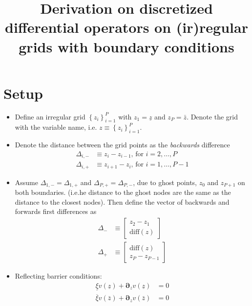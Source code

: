 \documentclass[11pt]{article}
\newcommand{\D}[1][]{\ensuremath{\boldsymbol{\partial}_{#1}}}
\newcommand{\set}[1]{\ensuremath{\left\{{#1}\right\}}}
\begin{document}
\title{Derivation on discretized differential operators on (ir)regular grids with boundary conditions}
\maketitle

\section{Setup}

\begin{itemize}
	\item Define an irregular grid $\set{z_i}_{i=1}^P$ with $z_1 = \underline{z}$ and $z_P = \bar{z}$. Denote the grid with the variable name, i.e. $z \equiv \set{z_i}_{i=1}^P$.
	\item Denote the distance between the grid points as the \textit{backwards} difference
	\begin{align}
	\Delta_{i,-} &\equiv z_i - z_{i-1},\, \text{for } i = 2,\ldots, P\\
	\Delta_{i,+} &\equiv z_{i+1} - z_i,\, \text{for } i = 1,\ldots, P-1
	\end{align}
	
	\item Assume $\Delta_{1, -} = \Delta_{1, +}$ and $\Delta_{P, +} = \Delta_{P, -}$, due to ghost points, $z_0$ and $z_{P+1}$ on both boundaries. (i.e.he distance to the ghost nodes are the same as the distance to the closest nodes).  Then define the vector of backwards and forwards first differences as
	\begin{align}
	\Delta_{-} &\equiv \begin{bmatrix} z_2 - z_1 \\
	\text{diff}(z)
	\end{bmatrix}\\
	\Delta_{+} &\equiv \begin{bmatrix} \text{diff}(z)\\
	z_P - z_{P-1}
	\end{bmatrix}
	\end{align}
	\item Reflecting barrier conditions:
	\begin{align}
	\underline{\xi} v(\underline{z}) + \D[z]v(\underline{z} ) &= 0\label{eq:new-BC1}\\
	\overline{\xi} v(\bar{z}) + \D[z]v(\bar{z}) &= 0\label{eq:new-BC2}
	\end{align}
\end{itemize}
\end{document}
